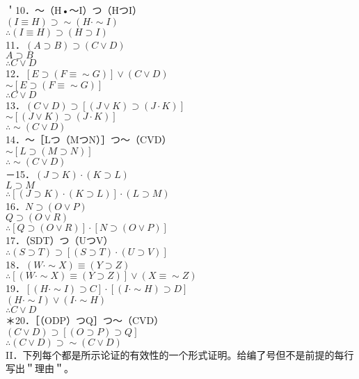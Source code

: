 ＇10．～（H•～I）つ（HつI）\\
$(I \equiv H) \supset \sim(H \cdot \sim I)$\\
$\therefore(I \equiv H) \supset(H \supset I)$\\
11．$(A \supset B) \supset(C \vee D)$\\
$A \supset B$\\
$\therefore C \vee D$\\
12．$[E \supset(F \equiv \sim G)] \vee(C \vee D)$\\
$\sim[E \supset(F \equiv \sim G)]$\\
$\therefore C \vee D$\\
13．$(C \vee D) \supset[(J \vee K) \supset(J \cdot K)]$\\
$\sim[(J \vee K) \supset(J \cdot K)]$\\
$\therefore \sim(C \vee D)$\\
14．～［Lつ（MつN）］つ～（CVD）\\
$\sim[L \supset(M \supset N)]$\\
$\therefore \sim(C \vee D)$\\
－15．$(J \supset K) \cdot(K \supset L)$\\
$L \supset M$\\
$\therefore[(J \supset K) \cdot(K \supset L)] \cdot(L \supset M)$\\
16．$N \supset(O \vee P)$\\
$Q \supset(O \vee R)$\\
$\therefore[Q \supset(O \vee R)] \cdot[N \supset(O \vee P)]$\\
17．（SDT）つ（UつV）\\
$\therefore(S \supset T) \supset[(S \supset T) \cdot(U \supset V)]$\\
18．$(W \cdot \sim X) \equiv(Y \supset Z)$\\
$\therefore[(W \cdot \sim X) \equiv(Y \supset Z)] \vee(X \equiv \sim Z)$\\
19．$[(H \cdot \sim I) \supset C] \cdot[(I \cdot \sim H) \supset D]$\\
$(H \cdot \sim I) \vee(I \cdot \sim H)$\\
$\therefore C \vee D$\\
＊20．［（ODP）つQ］つ～（CVD）\\
$(C \vee D) \supset[(O \supset P) \supset Q]$\\
$\therefore(C \vee D) \supset \sim(C \vee D)$\\
II．下列每个都是所示论证的有效性的一个形式证明。给编了号但不是前提的每行写出＂理由＂。\\
